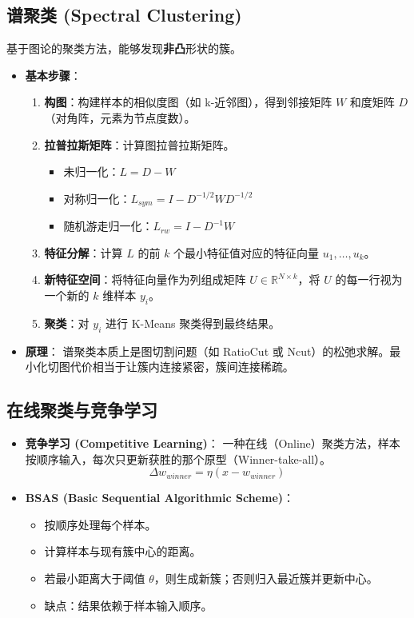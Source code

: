 \documentclass[a4paper, 11pt]{ctexart}
\begin{document}
\subsection{谱聚类 (Spectral Clustering)}
基于图论的聚类方法，能够发现\textbf{非凸}形状的簇。

\begin{itemize}
    \item \textbf{基本步骤}：
    \begin{enumerate}
        \item \textbf{构图}：构建样本的相似度图（如 k-近邻图），得到邻接矩阵 $W$ 和度矩阵 $D$（对角阵，元素为节点度数）。
        \item \textbf{拉普拉斯矩阵}：计算图拉普拉斯矩阵。
        \begin{itemize}
            \item 未归一化：$L = D - W$
            \item 对称归一化：$L_{sym} = I - D^{-1/2} W D^{-1/2}$
            \item 随机游走归一化：$L_{rw} = I - D^{-1} W$
        \end{itemize}
        \item \textbf{特征分解}：计算 $L$ 的前 $k$ 个最小特征值对应的特征向量 $u_1, \dots, u_k$。
        \item \textbf{新特征空间}：将特征向量作为列组成矩阵 $U \in \mathbb{R}^{N \times k}$，将 $U$ 的每一行视为一个新的 $k$ 维样本 $y_i$。
        \item \textbf{聚类}：对 $y_i$ 进行 K-Means 聚类得到最终结果。
    \end{enumerate}
    \item \textbf{原理}：
    谱聚类本质上是图切割问题（如 RatioCut 或 Ncut）的松弛求解。最小化切图代价相当于让簇内连接紧密，簇间连接稀疏。
\end{itemize}

\subsection{在线聚类与竞争学习}
\begin{itemize}
    \item \textbf{竞争学习 (Competitive Learning)}：
    一种在线（Online）聚类方法，样本按顺序输入，每次只更新获胜的那个原型（Winner-take-all）。
    \[ \Delta w_{winner} = \eta (x - w_{winner}) \]
    \item \textbf{BSAS (Basic Sequential Algorithmic Scheme)}：
    \begin{itemize}
        \item 按顺序处理每个样本。
        \item 计算样本与现有簇中心的距离。
        \item 若最小距离大于阈值 $\theta$，则生成新簇；否则归入最近簇并更新中心。
        \item 缺点：结果依赖于样本输入顺序。
    \end{itemize}
\end{itemize}
\end{document}
